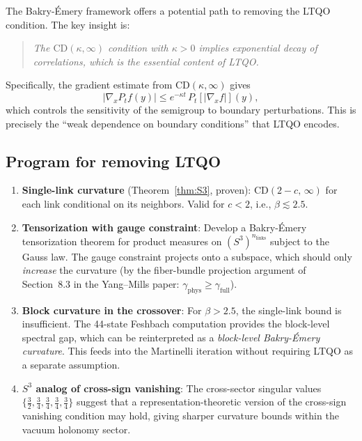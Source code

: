 \documentclass[11pt,a4paper]{article}
\theoremstyle{plain}
\theoremstyle{definition}
\theoremstyle{remark}
\begin{document}
The Bakry-\'{E}mery framework offers a potential path to removing the
LTQO condition.  The key insight is:

\begin{quote}
\emph{The $\mathrm{CD}(\kappa,\infty)$ condition with $\kappa > 0$
implies exponential decay of correlations, which is the essential
content of LTQO.}
\end{quote}

Specifically, the gradient estimate from $\mathrm{CD}(\kappa,\infty)$
gives
\begin{equation}
  |\nabla_x P_t f(y)| \le e^{-\kappa t}\, P_t[|\nabla_x f|](y),
\end{equation}
which controls the sensitivity of the semigroup to boundary
perturbations.  This is precisely the ``weak dependence on boundary
conditions'' that LTQO encodes.

\subsection{Program for removing LTQO}

\begin{enumerate}
\item \textbf{Single-link curvature} (Theorem~\ref{thm:S3}, proven):
  $\mathrm{CD}(2-c,\,\infty)$ for each link conditional on its neighbors.
  Valid for $c < 2$, i.e., $\beta \lesssim 2.5$.

\item \textbf{Tensorization with gauge constraint}: Develop a
  Bakry-\'{E}mery tensorization theorem for product measures on
  $(S^3)^{n_{\mathrm{links}}}$ subject to the Gauss law.  The gauge
  constraint projects onto a subspace, which should only
  \emph{increase} the curvature (by the fiber-bundle projection argument
  of Section~8.3 in the Yang--Mills paper:
  $\gamma_{\mathrm{phys}} \ge \gamma_{\mathrm{full}}$).

\item \textbf{Block curvature in the crossover}: For $\beta > 2.5$,
  the single-link bound is insufficient.  The 44-state Feshbach
  computation provides the block-level spectral gap, which can be
  reinterpreted as a \emph{block-level Bakry-\'{E}mery curvature}.
  This feeds into the Martinelli iteration without requiring LTQO as
  a separate assumption.

\item \textbf{$S^3$ analog of cross-sign vanishing}: The cross-sector
  singular values $\{\tfrac{3}{2}, \tfrac{3}{4}, \tfrac{3}{4},
  \tfrac{3}{4}, \tfrac{3}{4}\}$ suggest that a
  representation-theoretic version of the cross-sign vanishing
  condition may hold, giving sharper curvature bounds within the vacuum
  holonomy sector.
\end{enumerate}
\end{document}

